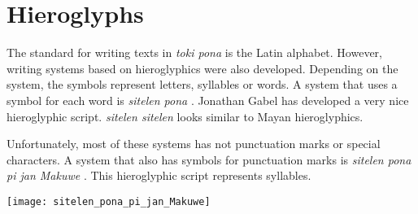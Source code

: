 \section{Hieroglyphs}
%

The standard for writing texts in \textit{toki pona} is the Latin alphabet.
However, writing systems based on hieroglyphics were also developed.
Depending on the system, the symbols represent letters, syllables or words.
A system that uses a symbol for each word is \textit{sitelen pona} \cite{www:tokipona.org:02}.
Jonathan Gabel has developed a very nice hieroglyphic script.
\textit{sitelen sitelen} \cite{www:jonathangabel.com:01} looks similar to Mayan hieroglyphics.

Unfortunately, most of these systems has not punctuation marks or special characters.
A system that also has symbols for punctuation marks is \textit{sitelen pona pi jan Makuwe} \cite{www:janMakuwe:01}.
This hieroglyphic script represents syllables.

\texttt{[image: sitelen\_pona\_pi\_jan\_Makuwe]}

%
